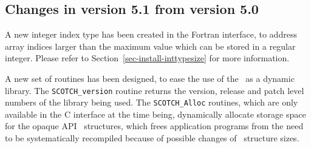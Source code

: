 \subsection{Changes in version 5.1 from version 5.0}

A new integer index type has been created in the Fortran interface, to
address array indices larger than the maximum value which can be
stored in a regular integer. Please refer to
Section~\ref{sec-install-inttypesize} for more information.

A new set of routines has been designed, to ease the use of the
\libscotch\ as a dynamic library. The \texttt{SCOTCH\_\lbt version}
routine returns the version, release and patch level numbers of the
library being used. The \texttt{SCOTCH\_\lbt *Alloc} routines,
which are only available in the C interface at the time being,
dynamically allocate storage space for the opaque API
\scotch\ structures, which frees application programs from the need
to be systematically recompiled because of possible changes of
\scotch\ structure sizes.
